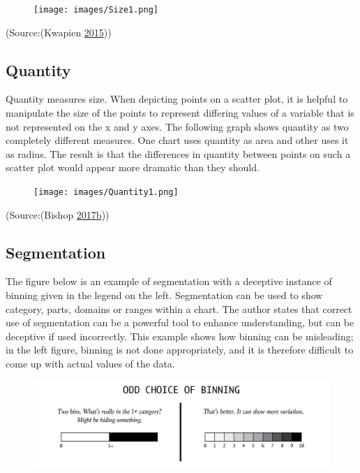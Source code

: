 \documentclass[]{book}
\begin{document}
\begin{figure}
\centering
\texttt{[image: images/Size1.png]}
\caption{}
\end{figure}

(Source:(Kwapien \protect\hyperlink{ref-misleading_data}{2015}))

\subsection{Quantity}\label{quantity}

Quantity measures size. When depicting points on a scatter plot, it is
helpful to manipulate the size of the points to represent differing
values of a variable that is not represented on the x and y axes. The
following graph shows quantity as two completely different measures. One
chart uses quantity as area and other uses it as radius. The result is
that the differences in quantity between points on such a scatter plot
would appear more dramatic than they should.

\begin{figure}
\centering
\texttt{[image: images/Quantity1.png]}
\caption{}
\end{figure}

(Source:(Bishop
\protect\hyperlink{ref-study_asks}{2017}\protect\hyperlink{ref-study_asks}{b}))

\subsection{Segmentation}\label{segmentation}

The figure below is an example of segmentation with a deceptive instance
of binning given in the legend on the left. Segmentation can be used to
show category, parts, domains or ranges within a chart. The author
states that correct use of segmentation can be a powerful tool to
enhance understanding, but can be deceptive if used incorrectly. This
example shows how binning can be misleading; in the left figure, binning
is not done appropriately, and it is therefore difficult to come up with
actual values of the data.

\begin{figure}
\centering
\includegraphics{images/Segmentation1.png}
\caption{}
\end{figure}
\end{document}
